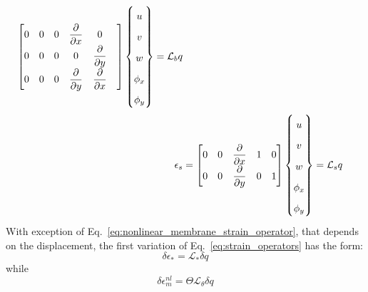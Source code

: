 \documentclass[12pt]{article}
\numberwithin{equation}{section}
\newcommand{\dpdiff}[2]{ \dfrac{\partial #1}{ \partial #2} }
\begin{document}
\begin{subequations}
\begin{align}
{\begin{bmatrix}
            0 & 0 & 0 & \dpdiff{ }{x} & 0               \\
            0 & 0 & 0 & 0             & \dpdiff{ }{y} & \\
            0 & 0 & 0 & \dpdiff{ }{y} & \dpdiff{ }{x} &
        \end{bmatrix}
        }
        \begin{Bmatrix}
            u      \\
            v      \\
            w      \\
            \phi_x \\
            \phi_y
        \end{Bmatrix} = \mathcal{L}_b q                         \\
        \label{eq:shear_strain_operator}
        \epsilon_s      & =
        {\renewcommand\arraystretch{1.75}
        \begin{bmatrix}
            0 & 0 & \dpdiff{ }{x} & 1 & 0 \\
            0 & 0 & \dpdiff{ }{y} & 0 & 1 \\
        \end{bmatrix}
        }
        \begin{Bmatrix}
            u      \\
            v      \\
            w      \\
            \phi_x \\
            \phi_y
        \end{Bmatrix} = \mathcal{L}_s q
    \end{align}
    \label{eq:strain_operators}
\end{subequations}
%
With exception of Eq.~\eqref{eq:nonlinear_membrane_strain_operator}, that depends on the displacement, the first variation of Eq.~\eqref{eq:strain_operators} has the form:
%
\begin{equation}
    \delta \epsilon_\ast = \mathcal{L}_\ast \delta q
\end{equation}
%
while
\begin{equation}
    \delta \epsilon_m^{nl} = \Theta \mathcal{L}_\theta \delta q
\end{equation}
\end{document}
